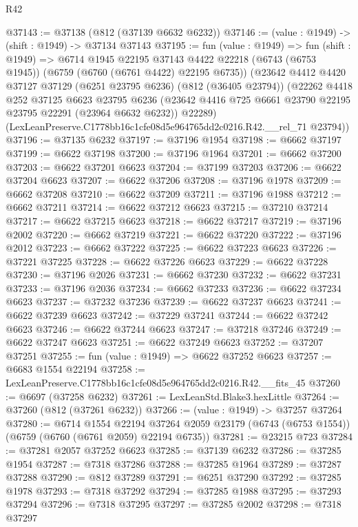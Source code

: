 \begin{lexlean}{R42}
\begin{coremodule}
{@37143 := @37138 (@812 (@37139 @6632 @6232))
@37146 := (value : @1949) -> (shift : @1949) -> @37134 @37143
@37195 := fun (value : @1949) =>
  fun (shift : @1949) =>
  @6714
    @1945
    @22195
    @37143
    @4422
    @22218
    (@6743 (@6753 @1945))
    (@6759 (@6760 (@6761 @4422) @22195 @6735))
    (@23642
      @4412
      @4420
      @37127
      @37129
      (@6251 @23795 @6236)
      (@812 (@36405 @23794))
      (@22262
        @4418
        @252
        @37125
        @6623
        @23795
        @6236
        (@23642 @4416 @725 @6661 @23790 @22195 @23795 @22291 (@23964 @6632 @6232))
        @22289)
      (LexLeanPreserve.C1778bb16c1cfe08d5e964765dd2c0216.R42.__rel_71 @23794))
@37196 := @37135 @6232
@37197 := @37196 @1954
@37198 := @6662 @37197
@37199 := @6622 @37198
@37200 := @37196 @1964
@37201 := @6662 @37200
@37203 := @6622 @37201 @6623
@37204 := @37199 @37203
@37206 := @6622 @37204 @6623
@37207 := @6622 @37206
@37208 := @37196 @1978
@37209 := @6662 @37208
@37210 := @6622 @37209
@37211 := @37196 @1988
@37212 := @6662 @37211
@37214 := @6622 @37212 @6623
@37215 := @37210 @37214
@37217 := @6622 @37215 @6623
@37218 := @6622 @37217
@37219 := @37196 @2002
@37220 := @6662 @37219
@37221 := @6622 @37220
@37222 := @37196 @2012
@37223 := @6662 @37222
@37225 := @6622 @37223 @6623
@37226 := @37221 @37225
@37228 := @6622 @37226 @6623
@37229 := @6622 @37228
@37230 := @37196 @2026
@37231 := @6662 @37230
@37232 := @6622 @37231
@37233 := @37196 @2036
@37234 := @6662 @37233
@37236 := @6622 @37234 @6623
@37237 := @37232 @37236
@37239 := @6622 @37237 @6623
@37241 := @6622 @37239 @6623
@37242 := @37229 @37241
@37244 := @6622 @37242 @6623
@37246 := @6622 @37244 @6623
@37247 := @37218 @37246
@37249 := @6622 @37247 @6623
@37251 := @6622 @37249 @6623
@37252 := @37207 @37251
@37255 := fun (value : @1949) => @6622 @37252 @6623
@37257 := @6683 @1554 @22194
@37258 := LexLeanPreserve.C1778bb16c1cfe08d5e964765dd2c0216.R42.__fits_45
@37260 := @6697 (@37258 @6232)
@37261 := LexLeanStd.Blake3.hexLittle
@37264 := @37260 (@812 (@37261 @6232))
@37266 := (value : @1949) -> @37257 @37264
@37280 := @6714
    @1554
    @22194
    @37264
    @2059
    @23179
    (@6743 (@6753 @1554))
    (@6759 (@6760 (@6761 @2059) @22194 @6735))
@37281 := @23215 @723
@37284 := @37281 @2057 @37252 @6623
@37285 := @37139 @6232
@37286 := @37285 @1954
@37287 := @7318 @37286
@37288 := @37285 @1964
@37289 := @37287 @37288
@37290 := @812 @37289
@37291 := @6251 @37290
@37292 := @37285 @1978
@37293 := @7318 @37292
@37294 := @37285 @1988
@37295 := @37293 @37294
@37296 := @7318 @37295
@37297 := @37285 @2002
@37298 := @7318 @37297
}
\end{coremodule}
\end{lexlean}
